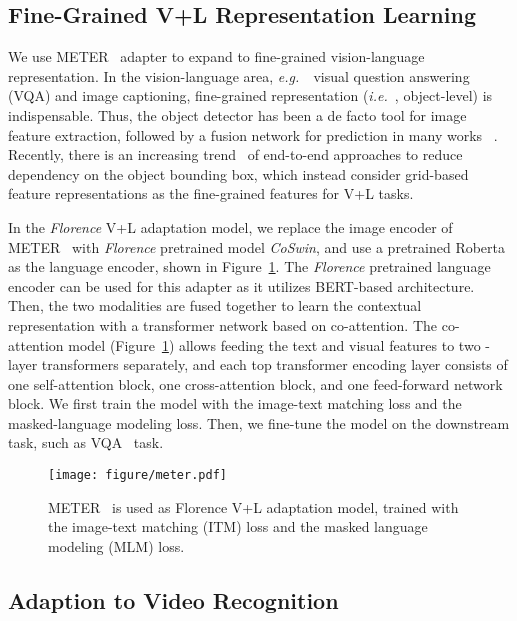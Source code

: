 \documentclass{article}
\newcommand{\eg}{{\it{e.g.}~}}
\newcommand{\ie}{{\it{i.e.}~}}
\begin{document}
\subsection{Fine-Grained V+L Representation Learning}

We use METER~\cite{dou2021empirical} adapter to expand to fine-grained vision-language representation. In the vision-language area, \eg ~visual question answering (VQA) and image captioning, fine-grained representation (\ie, object-level) is indispensable. Thus, the object detector has been a de facto tool for image feature extraction,
followed by a fusion network for prediction in many works ~\cite{00010BT0GZ18,li:oscar,Zhang_2021_CVPR,abs-2012-06946,abs-2104-02096,chen:uniter}.
Recently, there is an increasing trend~\cite{abs-2104-03135,xue2021probing,wang2021simvlm,KimSK21,dou2021empirical} of end-to-end approaches to reduce dependency on the object bounding box, which instead consider grid-based feature representations as the fine-grained features for V+L tasks.

In the \emph{Florence} V+L adaptation model, we replace the image encoder of METER~\cite{dou2021empirical} with \emph{Florence} pretrained model \emph{CoSwin}, and use a pretrained  Roberta~\cite{liu2019roberta} as the language encoder, shown in Figure~\ref{fig:florence_meter}. The \emph{Florence} pretrained language encoder can be used for this adapter as it utilizes BERT-based architecture. Then, the two modalities are fused together to learn the contextual representation with a transformer network based on co-attention. The co-attention model
(Figure~\ref{fig:florence_meter}) allows feeding the text and visual features to two -layer transformers separately, and each top transformer encoding layer consists of one self-attention block, one cross-attention block, and one feed-forward network block. We first train the model with the image-text matching loss and the masked-language modeling loss. Then, we fine-tune the model on the downstream task, such as VQA~\cite{GoyalKSBP16} task.

\begin{figure}[t!]
    \centering
    \texttt{[image: figure/meter.pdf]}
    \caption{METER~\cite{dou2021empirical} is used as Florence V+L adaptation model, trained with
    the image-text matching (ITM) loss
    and the masked language modeling (MLM) loss.}
    \label{fig:florence_meter}
\end{figure}

\subsection{Adaption to Video Recognition}
\label{sect:adapt_video}
\end{document}
